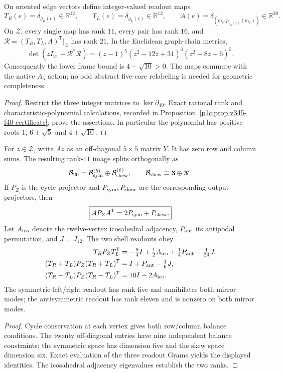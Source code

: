 \documentclass[11pt]{article}
\begin{document}
\begin{theorem}
\label{p1:thm:v345-f40-triple-frame}
On oriented edge vectors define integer-valued readout maps
\[
 T_R(e)=\delta_{g_R(e)}\in\mathbb R^{12},\qquad
 T_L(e)=\delta_{g_L(e)}\in\mathbb R^{12},\qquad
 A(e)=\delta_{(m_e,p_{g_R(e)}(m_e))}\in\mathbb R^{20}.
\]
On $\mathcal Z$, every single map has rank $11$, every pair has rank
$16$, and $\mathcal R=(T_R,T_L,A)^{\mathsf T}|_{\mathcal Z}$
has rank $21$.  In the Euclidean graph-chain metrics,
\[
 \boxed{\det(zI_{21}-\mathcal R^*\mathcal R)
 =(z-1)^5(z^2-12z+31)^3(z^2-8z+6)^5.}
\]
Consequently the lower frame bound is $4-\sqrt{10}>0$.
The maps commute with the native $A_5$ action; no odd abstract
five-core relabeling is needed for geometric completeness.
\end{theorem}
\begin{proof}
Restrict the three integer matrices to $\ker\partial_{40}$.
Exact rational rank and characteristic-polynomial calculations,
recorded in Proposition~\ref{p1c:prop:v345-f40-certificate},
prove the assertions.  In particular the polynomial has positive
roots $1$, $6\pm\sqrt5$ and $4\pm\sqrt{10}$.
\end{proof}

\begin{proposition}
\label{p1:prop:v345-f40-balanced-mirror}
For $z\in\mathcal Z$, write $Az$ as an off-diagonal $5\times5$
matrix $Y$.  It has zero row and column sums.  The resulting
rank-$11$ image splits orthogonally as
\[
 \mathcal B_{20}=\mathcal B_{\rm sym}^{(5)}\oplus
 \mathcal B_{\rm skew}^{(6)},\qquad
 \mathcal B_{\rm skew}\cong\mathbf3\oplus\mathbf3'.
\]
If $P_Z$ is the cycle projector and $P_{\rm sym},P_{\rm skew}$
are the corresponding output projectors, then
\[
 \boxed{AP_ZA^{\mathsf T}=2P_{\rm sym}+P_{\rm skew}.}
\]
Let $A_{\rm ico}$ denote the twelve-vertex icosahedral adjacency,
$P_{\rm ant}$ its antipodal permutation, and $J=J_{12}$.  The two
shell readouts obey
\[
 \begin{split}
 T_RP_ZT_L^{\mathsf T}&=-\tfrac94I+\tfrac12A_{\rm ico}
 +\tfrac14P_{\rm ant}-\tfrac1{24}J,\\
 (T_R+T_L)P_Z(T_R+T_L)^{\mathsf T}
 &=I+P_{\rm ant}-\tfrac16J,\\
 (T_R-T_L)P_Z(T_R-T_L)^{\mathsf T}
 &=10I-2A_{\rm ico}.
 \end{split}
\]
The symmetric left/right readout has rank five and annihilates
both mirror modes; the antisymmetric readout has rank eleven and
is nonzero on both mirror modes.
\end{proposition}
\begin{proof}
Cycle conservation at each vertex gives both row/column
balance conditions.  The twenty off-diagonal entries have nine
independent balance constraints; the symmetric space has dimension
five and the skew space dimension six.  Exact evaluation of the
three readout Grams yields the displayed identities.  The
icosahedral adjacency eigenvalues establish the two ranks.
\end{proof}
\end{document}
